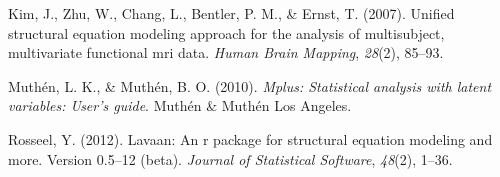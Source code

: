 \documentclass[jou]{apa6}
\theoremstyle{definition}
\theoremstyle{definition}
\theoremstyle{definition}
\theoremstyle{remark}
\begin{document}
\leavevmode\hypertarget{ref-kim2007unified}{}%
Kim, J., Zhu, W., Chang, L., Bentler, P. M., \& Ernst, T. (2007).
Unified structural equation modeling approach for the analysis of
multisubject, multivariate functional mri data. \emph{Human Brain
Mapping}, \emph{28}(2), 85--93.

\leavevmode\hypertarget{ref-muthen2010mplus}{}%
Muthén, L. K., \& Muthén, B. O. (2010). \emph{Mplus: Statistical
analysis with latent variables: User's guide}. Muthén \& Muthén Los
Angeles.

\leavevmode\hypertarget{ref-rosseel2012lavaan}{}%
Rosseel, Y. (2012). Lavaan: An r package for structural equation
modeling and more. Version 0.5--12 (beta). \emph{Journal of Statistical
Software}, \emph{48}(2), 1--36.
\end{document}
